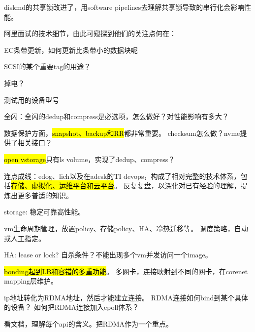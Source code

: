 diskmd的共享锁改进了，用software pipelines去理解共享锁导致的串行化会影响性能。

阿里面试的技术细节，由此可窥探到他们的关注点何在：
\begin{enumbox}
\item EC条带更新，如何更新比条带小的数据块呢
\item SCSI的某个重要tag的用途？
\item 掉电？
\item 测试用的设备型号
\end{enumbox}

\hrulefill

全闪：全闪的dedup和compress是必选项，怎么做好？对性能影响有多大？

数据保护方面，\hl{snapshot、backup和RR}都非常重要。
checksum怎么做？nvme提供了相关接口？

\hl{open vstorage}只有ls volume，实现了dedup、compress？

\hrulefill

连点成线：edog、lich以及在adesk的TI devops，构成了相对完整的技术体系，包括\hl{存储、虚拟化、运维平台和云平台}。
反复复盘，以深化对已有经验的理解，提炼出更多普适的知识。

storage: 稳定可靠高性能。

vm生命周期管理，放置policy、存储policy、HA、冷热迁移等。
调度策略，自动或人工指定。

HA: lease or lock? 自杀条件？不能出现多个vm并发访问一个image。

\hrulefill

\hl{bonding起到LB和容错的多重功能}。
多网卡，连接映射到不同的网卡，在corenet mapping层维护。

ip地址转化为RDMA地址，然后才能建立连接。
RDMA连接如何bind到某个具体的设备？
如何把RDMA连接加入epoll体系？

看文档，理解每个api的含义。把RDMA作为一个重点。
